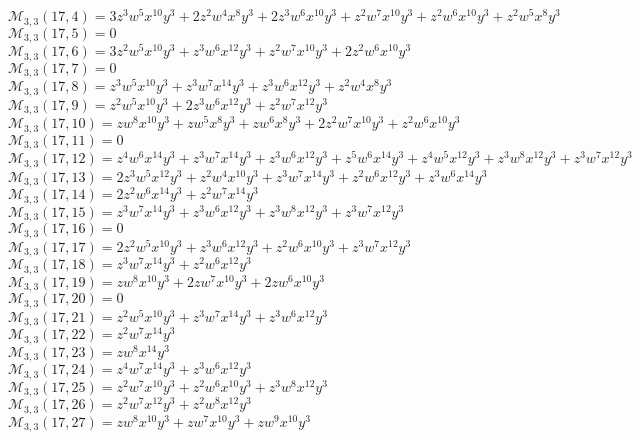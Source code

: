 \documentclass[12pt]{memoireuqam1.3}
\begin{document}
$\mathcal{M}_{3,3}(17,4)=3z^3w^5x^{10}y^3+2z^2w^4x^8y^3+2z^3w^6x^{10}y^3+z^2w^7x^{10}y^3+z^2w^6x^{10}y^3+z^2w^5x^8y^3$\\
$\mathcal{M}_{3,3}(17,5)=0$\\
$\mathcal{M}_{3,3}(17,6)=3z^2w^5x^{10}y^3+z^3w^6x^{12}y^3+z^2w^7x^{10}y^3+2z^2w^6x^{10}y^3$\\
$\mathcal{M}_{3,3}(17,7)=0$\\
$\mathcal{M}_{3,3}(17,8)=z^3w^5x^{10}y^3+z^3w^7x^{14}y^3+z^3w^6x^{12}y^3+z^2w^4x^8y^3$\\
$\mathcal{M}_{3,3}(17,9)=z^2w^5x^{10}y^3+2z^3w^6x^{12}y^3+z^2w^7x^{12}y^3$\\
$\mathcal{M}_{3,3}(17,10)=zw^8x^{10}y^3+zw^5x^8y^3+zw^6x^8y^3+2z^2w^7x^{10}y^3+z^2w^6x^{10}y^3$\\
$\mathcal{M}_{3,3}(17,11)=0$\\
$\mathcal{M}_{3,3}(17,12)=z^4w^6x^{14}y^3+z^3w^7x^{14}y^3+z^3w^6x^{12}y^3+z^5w^6x^{14}y^3+z^4w^5x^{12}y^3+z^3w^8x^{12}y^3+z^3w^7x^{12}y^3$\\
$\mathcal{M}_{3,3}(17,13)=2z^3w^5x^{12}y^3+z^2w^4x^{10}y^3+z^3w^7x^{14}y^3+z^2w^6x^{12}y^3+z^3w^6x^{14}y^3$\\
$\mathcal{M}_{3,3}(17,14)=2z^2w^6x^{14}y^3+z^2w^7x^{14}y^3$\\
$\mathcal{M}_{3,3}(17,15)=z^3w^7x^{14}y^3+z^3w^6x^{12}y^3+z^3w^8x^{12}y^3+z^3w^7x^{12}y^3$\\
$\mathcal{M}_{3,3}(17,16)=0$\\
$\mathcal{M}_{3,3}(17,17)=2z^2w^5x^{10}y^3+z^3w^6x^{12}y^3+z^2w^6x^{10}y^3+z^3w^7x^{12}y^3$\\
$\mathcal{M}_{3,3}(17,18)=z^3w^7x^{14}y^3+z^2w^6x^{12}y^3$\\
$\mathcal{M}_{3,3}(17,19)=zw^8x^{10}y^3+2zw^7x^{10}y^3+2zw^6x^{10}y^3$\\
$\mathcal{M}_{3,3}(17,20)=0$\\
$\mathcal{M}_{3,3}(17,21)=z^2w^5x^{10}y^3+z^3w^7x^{14}y^3+z^3w^6x^{12}y^3$\\
$\mathcal{M}_{3,3}(17,22)=z^2w^7x^{14}y^3$\\
$\mathcal{M}_{3,3}(17,23)=zw^8x^{14}y^3$\\
$\mathcal{M}_{3,3}(17,24)=z^4w^7x^{14}y^3+z^3w^6x^{12}y^3$\\
$\mathcal{M}_{3,3}(17,25)=z^2w^7x^{10}y^3+z^2w^6x^{10}y^3+z^3w^8x^{12}y^3$\\
$\mathcal{M}_{3,3}(17,26)=z^2w^7x^{12}y^3+z^2w^8x^{12}y^3$\\
$\mathcal{M}_{3,3}(17,27)=zw^8x^{10}y^3+zw^7x^{10}y^3+zw^9x^{10}y^3$\\
\end{document}
